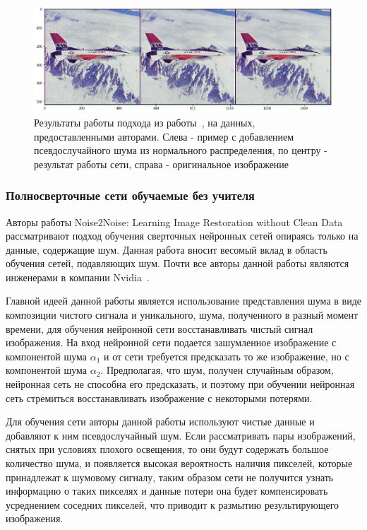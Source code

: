 \begin{figure}[h]
	\centering
	\includegraphics[width=\textwidth]{img/deep_prior_res}
	\caption{Результаты работы подхода из работы~\autocite{DeepPrior}, на данных, предоставленными авторами. Слева - пример с добавлением псевдослучайного шума из нормального распределения, по центру - результат работы сети, справа - оригинальное изображение}
	\label{fig:deep_prior_authors_example}
\end{figure}

\subsubsection{Полносверточные сети обучаемые без учителя}

Авторы работы Noise2Noise: Learning Image Restoration without Clean Data~\autocite{Noise2NoisePaper} рассматривают подход обучения сверточных нейронных сетей опираясь только на данные, содержащие шум. Данная работа вносит весомый вклад в область обучения сетей, подавляющих шум. Почти все авторы данной работы являются инженерами в компании Nvidia~\autocite{NvidiaTeam}. 

Главной идеей данной работы является использование представления шума в виде композиции чистого сигнала и уникального, шума, полученного в разный момент времени, для обучения нейронной сети восстанавливать чистый сигнал изображения. На вход нейронной сети подается зашумленное изображение с компонентой шума $\alpha_1$ и от сети требуется предсказать то же изображение, но с компонентой шума $\alpha_2$. Предполагая, что шум, получен случайным образом, нейронная сеть не способна его предсказать, и поэтому при обучении нейронная сеть стремиться восстанавливать изображение с некоторыми потерями.

Для обучения сети авторы данной работы используют чистые данные и добавляют к ним псевдослучайный шум. Если рассматривать пары изображений, снятых при условиях плохого освещения, то они будут содержать большое количество шума, и появляется высокая вероятность наличия пикселей, которые принадлежат к шумовому сигналу, таким образом сети не получится узнать информацию о таких пикселях и данные потери она будет компенсировать усреднением соседних пикселей, что приводит к размытию результирующего изображения.


